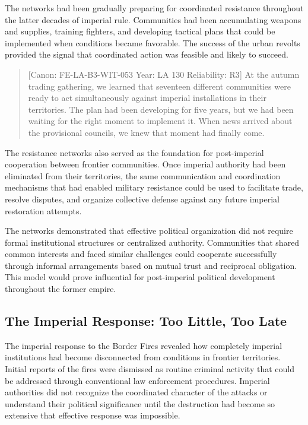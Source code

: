The networks had been gradually preparing for coordinated resistance
throughout the latter decades of imperial rule. Communities had been
accumulating weapons and supplies, training fighters, and developing
tactical plans that could be implemented when conditions became
favorable. The success of the urban revolts provided the signal that
coordinated action was feasible and likely to succeed.

\begin{quote}
{[}Canon: FE-LA-B3-WIT-053 \textbar{} Year: LA 130 \textbar{}
Reliability: R3{]} At the autumn trading gathering, we learned that
seventeen different communities were ready to act simultaneously against
imperial installations in their territories. The plan had been
developing for five years, but we had been waiting for the right moment
to implement it. When news arrived about the provisional councils, we
knew that moment had finally come.
\end{quote}

The resistance networks also served as the foundation for post-imperial
cooperation between frontier communities. Once imperial authority had
been eliminated from their territories, the same communication and
coordination mechanisms that had enabled military resistance could be
used to facilitate trade, resolve disputes, and organize collective
defense against any future imperial restoration attempts.

The networks demonstrated that effective political organization did not
require formal institutional structures or centralized authority.
Communities that shared common interests and faced similar challenges
could cooperate successfully through informal arrangements based on
mutual trust and reciprocal obligation. This model would prove
influential for post-imperial political development throughout the
former empire.

\subsection{The Imperial Response: Too Little, Too
Late}\label{the-imperial-response-too-little-too-late}

The imperial response to the Border Fires revealed how completely
imperial institutions had become disconnected from conditions in
frontier territories. Initial reports of the fires were dismissed as
routine criminal activity that could be addressed through conventional
law enforcement procedures. Imperial authorities did not recognize the
coordinated character of the attacks or understand their political
significance until the destruction had become so extensive that
effective response was impossible.

